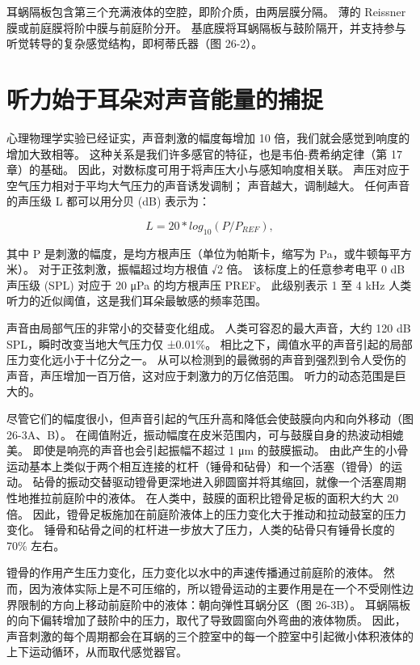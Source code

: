 耳蜗隔板包含第三个充满液体的空腔，即阶介质，由两层膜分隔。 薄的 Reissner 膜或前庭膜将阶中膜与前庭阶分开。 基底膜将耳蜗隔板与鼓阶隔开，并支持参与听觉转导的复杂感觉结构，即柯蒂氏器（图 26-2）。


\section{听力始于耳朵对声音能量的捕捉}
心理物理学实验已经证实，声音刺激的幅度每增加 10 倍，我们就会感觉到响度的增加大致相等。 这种关系是我们许多感官的特征，也是韦伯-费希纳定律（第 17 章）的基础。 因此，对数标度可用于将声压大小与感知响度相关联。 声压对应于空气压力相对于平均大气压力的声音诱发调制； 声音越大，调制越大。 任何声音的声压级 L 都可以用分贝 (dB) 表示为：

\begin{equation}\label{sound_pressure}
	L = 20 * log_10 (P/P_{REF}),
\end{equation}

其中 P 是刺激的幅度，是均方根声压（单位为帕斯卡，缩写为 Pa，或牛顿每平方米）。 对于正弦刺激，振幅超过均方根值 √2 倍。 该标度上的任意参考电平 0 dB 声压级 (SPL) 对应于 20 μPa 的均方根声压 PREF。 此级别表示 1 至 4 kHz 人类听力的近似阈值，这是我们耳朵最敏感的频率范围。

声音由局部气压的非常小的交替变化组成。 人类可容忍的最大声音，大约 120 dB SPL，瞬时改变当地大气压力仅 ±0.01\%。 相比之下，阈值水平的声音引起的局部压力变化远小于十亿分之一。 从可以检测到的最微弱的声音到强烈到令人受伤的声音，声压增加一百万倍，这对应于刺激力的万亿倍范围。 听力的动态范围是巨大的。

尽管它们的幅度很小，但声音引起的气压升高和降低会使鼓膜向内和向外移动（图 26-3A、B）。 在阈值附近，振动幅度在皮米范围内，可与鼓膜自身的热波动相媲美。 即使是响亮的声音也会引起振幅不超过 1 μm 的鼓膜振动。 由此产生的小骨运动基本上类似于两个相互连接的杠杆（锤骨和砧骨）和一个活塞（镫骨）的运动。 砧骨的振动交替驱动镫骨更深地进入卵圆窗并将其缩回，就像一个活塞周期性地推拉前庭阶中的液体。 在人类中，鼓膜的面积比镫骨足板的面积大约大 20 倍。 因此，镫骨足板施加在前庭阶液体上的压力变化大于推动和拉动鼓室的压力变化。 锤骨和砧骨之间的杠杆进一步放大了压力，人类的砧骨只有锤骨长度的 70\% 左右。

镫骨的作用产生压力变化，压力变化以水中的声速传播通过前庭阶的液体。 然而，因为液体实际上是不可压缩的，所以镫骨运动的主要作用是在一个不受刚性边界限制的方向上移动前庭阶中的液体：朝向弹性耳蜗分区（图 26-3B）。 耳蜗隔板的向下偏转增加了鼓阶中的压力，取代了导致圆窗向外弯曲的液体物质。 因此，声音刺激的每个周期都会在耳蜗的三个腔室中的每一个腔室中引起微小体积液体的上下运动循环，从而取代感觉器官。

